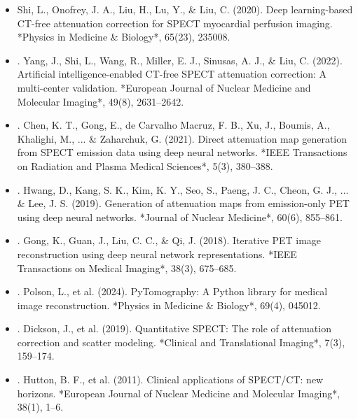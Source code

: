 \documentclass[11pt]{article}
\begin{document}
\begin{itemize}\item  Shi, L., Onofrey, J. A., Liu, H., Lu, Y., \& Liu, C. (2020). Deep learning-based CT-free attenuation correction for SPECT myocardial perfusion imaging. *Physics in Medicine \& Biology*, 65(23), 235008.\end{itemize}
\begin{itemize}\item . Yang, J., Shi, L., Wang, R., Miller, E. J., Sinusas, A. J., \& Liu, C. (2022). Artificial intelligence-enabled CT-free SPECT attenuation correction: A multi-center validation. *European Journal of Nuclear Medicine and Molecular Imaging*, 49(8), 2631–2642.\end{itemize}
\begin{itemize}\item . Chen, K. T., Gong, E., de Carvalho Macruz, F. B., Xu, J., Boumis, A., Khalighi, M., ... \& Zaharchuk, G. (2021). Direct attenuation map generation from SPECT emission data using deep neural networks. *IEEE Transactions on Radiation and Plasma Medical Sciences*, 5(3), 380–388.\end{itemize}
\begin{itemize}\item . Hwang, D., Kang, S. K., Kim, K. Y., Seo, S., Paeng, J. C., Cheon, G. J., ... \& Lee, J. S. (2019). Generation of attenuation maps from emission-only PET using deep neural networks. *Journal of Nuclear Medicine*, 60(6), 855–861.\end{itemize}
\begin{itemize}\item . Gong, K., Guan, J., Liu, C. C., \& Qi, J. (2018). Iterative PET image reconstruction using deep neural network representations. *IEEE Transactions on Medical Imaging*, 38(3), 675–685.\end{itemize}
\begin{itemize}\item . Polson, L., et al. (2024). PyTomography: A Python library for medical image reconstruction. *Physics in Medicine \& Biology*, 69(4), 045012.\end{itemize}
\begin{itemize}\item . Dickson, J., et al. (2019). Quantitative SPECT: The role of attenuation correction and scatter modeling. *Clinical and Translational Imaging*, 7(3), 159–174.\end{itemize}
\begin{itemize}\item . Hutton, B. F., et al. (2011). Clinical applications of SPECT/CT: new horizons. *European Journal of Nuclear Medicine and Molecular Imaging*, 38(1), 1–6.\end{itemize}
\end{document}
